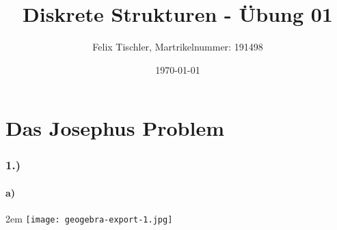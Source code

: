 \documentclass[titlepage]{article}
\begin{document}
	
	\title{Diskrete Strukturen - Übung 01}
	\author{Felix Tischler, Martrikelnummer: 191498}
	\date{\today}
	\maketitle

	\part*{Das Josephus Problem}
		\section*{1.)}
			\subsection*{a)}
			\begingroup
			\leftskip2em
			\texttt{[image: geogebra-export-1.jpg]}\\
\end{document}

